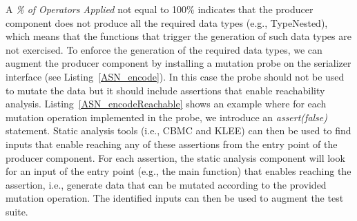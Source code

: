 A \emph{\% of Operators Applied} not equal to 100\% indicates that the producer component does not produce all the required data types (e.g., TypeNested), which means that the functions that trigger the generation of such data types are not exercised. To enforce the generation of the required data types, we can augment the producer component by installing a mutation probe on the serializer interface (see Listing~\ref{ASN_encode}). In this case the probe should not be used to mutate the data but it should include assertions that enable reachability analysis. Listing~\ref{ASN_encodeReachable} shows an example where for each mutation operation implemented in the probe, we introduce an \emph{assert(false)} statement. Static analysis tools (i.e., CBMC and KLEE)  can then be used to find inputs that enable reaching any of these assertions from the entry point of the producer component. For each assertion, the static analysis component will look for an input of the entry point (e.g., the main function) that enables reaching the assertion, i.e., generate data that can be mutated according to the provided mutation operation. The identified inputs can then be used to augment the test suite.



%
%
%
%


